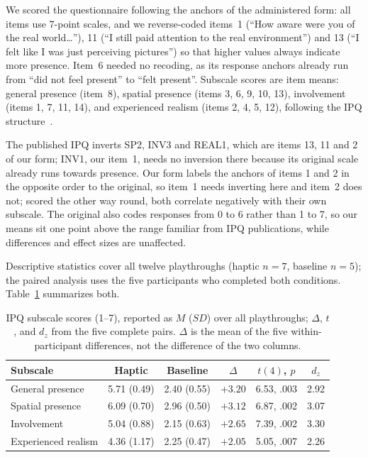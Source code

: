
We scored the questionnaire following the anchors of the administered form: all items use 7-point scales, and we reverse-coded items~1 (``How aware were you of the real world\ldots''), 11 (``I still paid attention to the real environment'') and 13 (``I felt like I was just perceiving pictures'') so that higher values always indicate more presence. Item~6 needed no recoding, as its response anchors already run from ``did not feel present'' to ``felt present''. Subscale scores are item means: general presence (item~8), spatial presence (items 3, 6, 9, 10, 13), involvement (items 1, 7, 11, 14), and experienced realism (items 2, 4, 5, 12), following the IPQ structure~\cite{Schubert.2001, Schubert.2003, igroup}.

The published IPQ inverts SP2, INV3 and REAL1, which are items 13, 11 and 2 of our form; INV1, our item~1, needs no inversion there because its original scale already runs towards presence. Our form labels the anchors of items 1 and 2 in the opposite order to the original, so item~1 needs inverting here and item~2 does not; scored the other way round, both correlate negatively with their own subscale. The original also codes responses from 0 to 6 rather than 1 to 7, so our means sit one point above the range familiar from IPQ publications, while differences and effect sizes are unaffected.

Descriptive statistics cover all twelve playthroughs (haptic $n=7$, baseline $n=5$); the paired analysis uses the five participants who completed both conditions. Table~\ref{tab:ipq-results} summarizes both.

\begin{table}[t]
  \caption{IPQ subscale scores (1--7), reported as $M$ ($SD$) over all playthroughs; $\Delta$, $t$, and $d_z$ from the five complete pairs. $\Delta$ is the mean of the five within-participant differences, not the difference of the two columns.}
  \label{tab:ipq-results}
  \small
  \setlength{\tabcolsep}{4pt}
  \begin{tabular}{lccccc}
    \toprule
    Subscale & Haptic & Baseline & $\Delta$ & $t(4)$, $p$ & $d_z$ \\
    \midrule
    General presence     & 5.71 (0.49) & 2.40 (0.55) & $+3.20$ & 6.53, .003 & 2.92 \\
    Spatial presence     & 6.09 (0.70) & 2.96 (0.50) & $+3.12$ & 6.87, .002 & 3.07 \\
    Involvement          & 5.04 (0.88) & 2.15 (0.63) & $+2.65$ & 7.39, .002 & 3.30 \\
    Experienced realism  & 4.36 (1.17) & 2.25 (0.47) & $+2.05$ & 5.05, .007 & 2.26 \\
    \bottomrule
  \end{tabular}
\end{table}

